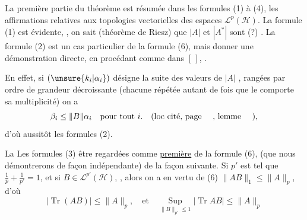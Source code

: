 La première partie du théorème est résumée dans les
formules (1) à (4),   les affirmations relatives
aux topologies vectorielles des espaces $\mathcal L^p(\mathcal H)$.
La formule (1) est évidente,  
 , on sait (théorème
de Riesz) que $|A|$ et $|A^*|$ sont  
(?) . La formule (2) est un cas
particulier de la formule (6), mais  
donner une démonstration 
directe, en procédant comme dans $[\,]$, .

En effet, si $(\unsure{k_i|\alpha_i})$  désigne la
suite des valeurs  de  $|A|$
 ,
rangées par ordre de grandeur
décroissante (chacune répétée autant de fois
que le comporte sa multiplicité) on a
\[
\beta_i\leq\|B\|\alpha_i\quad\text{pour tout }i.\quad(\text{loc cité, page \quad, lemme \quad}),
\]
d'où aussitôt les formules (2).

La 
Les formules (3)   être regardées  comme
\uline{première} 
 de la formule (6), (que nous démontrerons de façon indépendante) de la façon
suivante. Si $p'$ est tel que $\frac{1}{p}+\frac{1}{p'}=1$,
et si $B\in\mathcal L^{p'}(\mathcal H)$, 
, alors
on a en vertu de (6) $\|AB\|_1\leq\|A\|_p$, d'où
\[
|\operatorname{Tr}(AB)|\leq\|A\|_p,\quad\text{et}\quad
\operatorname*{Sup}_{\|B\|_{p'}\leq1}|\operatorname{Tr}AB|\leq\|A\|_p
\]
